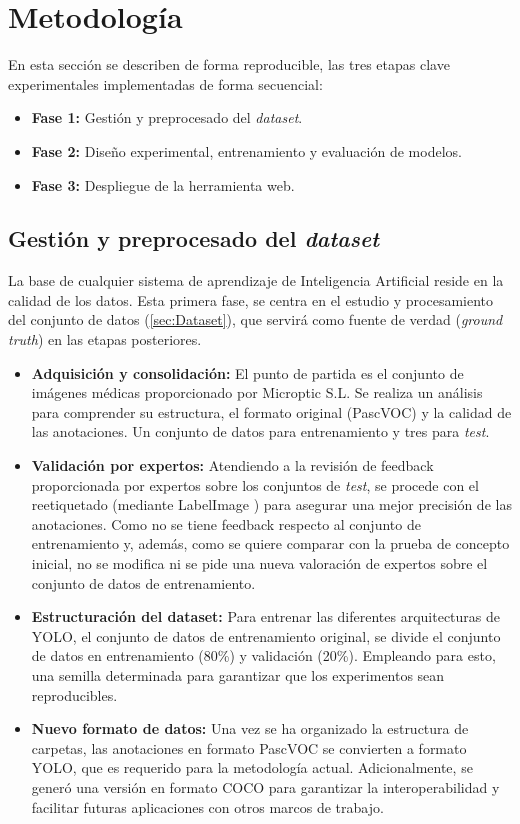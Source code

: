 \documentclass[12pt,a4paper,onecolumn,oneside]{report}
\begin{document}
\chapter{Metodología} %
\label{metodologia}

En esta sección se describen de forma reproducible, las tres etapas clave experimentales implementadas de forma secuencial: 
\begin{itemize}
  \item \textbf{Fase 1:} Gestión y preprocesado del \textit{dataset}.
  \item \textbf{Fase 2:} Diseño experimental, entrenamiento y evaluación de modelos.
  \item \textbf{Fase 3:} Despliegue de la herramienta web.
\end{itemize}

\section{Gestión y preprocesado del \textit{dataset}}
\label{Gestión y preprocesado del dataset}

La base de cualquier sistema de aprendizaje de Inteligencia Artificial reside en la calidad de los datos. Esta primera fase, se centra en el estudio y procesamiento del conjunto de datos (\autoref{sec:Dataset}), que servirá como
fuente de verdad (\textit{ground truth}) en las etapas posteriores.

\begin{itemize}
  \item \textbf{Adquisición y consolidación:} El punto de partida es el conjunto de imágenes médicas proporcionado por Microptic S.L. \cite{microptic} 
  Se realiza un análisis para comprender su estructura, el formato original (PascVOC) y la calidad de las anotaciones. Un conjunto de datos para entrenamiento y tres para \textit{test}.
  \item \textbf{Validación por expertos:} Atendiendo a la revisión de feedback proporcionada por expertos sobre los conjuntos de \textit{test}, se procede con el reetiquetado (mediante LabelImage \cite{labelimg_github}) para asegurar una mejor precisión de las anotaciones. 
  Como no se tiene feedback respecto al conjunto de entrenamiento y, además, como se quiere comparar con la prueba de concepto inicial, no se modifica ni se pide una nueva valoración de expertos sobre el conjunto de datos de entrenamiento.
  \item \textbf{Estructuración del dataset:} Para entrenar las diferentes arquitecturas de YOLO, el conjunto de datos de entrenamiento original, se divide el conjunto de datos en entrenamiento (80\%) y validación (20\%). Empleando para esto, una semilla determinada para garantizar que los experimentos sean reproducibles. 
  \item \textbf{Nuevo formato de datos:} Una vez se ha organizado la estructura de carpetas, las anotaciones en formato PascVOC se convierten a formato YOLO, que es requerido para la metodología actual. Adicionalmente, se generó una versión en formato COCO para garantizar la interoperabilidad y facilitar futuras aplicaciones con otros marcos de trabajo.
\end{itemize}
\end{document}
